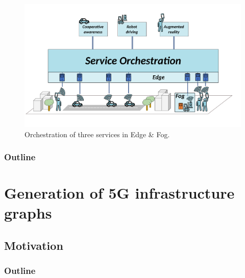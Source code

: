 \documentclass[aspectratio=169]{beamer}
\begin{document}
\begin{frame}
{\begin{minipage}{0.59\textwidth}
\begin{figure}
                \includegraphics[width=\textwidth]{img/big-picture-start-edge-fog.pdf}
                \caption{Orchestration of three services in Edge \& Fog.}
            \end{figure}
        \end{minipage}

    }
\end{frame}









\begin{frame}
    \frametitle{Outline}
\end{frame}



\section{Generation of 5G infrastructure graphs}
\subsection{Motivation}
\begin{frame}
    \frametitle{Outline}
    \tableofcontents[subsectionstyle=show/shaded/hide,sectionstyle=show/shaded]
\end{frame}
\end{document}
